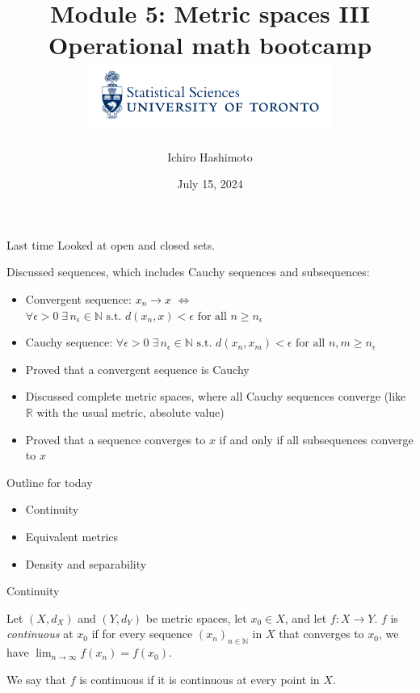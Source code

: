 \documentclass [aspectratio=169]{beamer}
\title[]{Module 5: Metric spaces III \\ {\large Operational math bootcamp}\\ \includegraphics[width=8cm]{dept_logo.png}\vspace{-1em}}
\author[]{Ichiro Hashimoto}
\institute[]{University of Toronto}
\date{July 15, 2024}
\newcommand{\R}{{\mathbb{R}}}
\newcommand{\N}{{\mathbb{N}}}
\begin{document}
{
\begin{frame}
    \titlepage
\end{frame}
}


\begin{frame}{Last time}
Looked at open and closed sets.

\vspace{0.5em}

Discussed sequences, which includes Cauchy sequences and subsequences:
\vspace{0.5em}
	\begin{itemize}
	   \setlength\itemsep{0.6em}
	\item Convergent sequence: $x_n \to x$ $\Leftrightarrow$ $\forall \epsilon > 0 \; \exists \, n_\epsilon \in \N \text{ s.t. } d(x_n,x) < \epsilon \text{ for all } n \geq n_\epsilon$
	\item Cauchy sequence:  $ \forall \epsilon>0 \; \exists \, n_\epsilon \in \N \text{ s.t. } d(x_n,x_m) < \epsilon \text{ for all } n,m \geq n_\epsilon$
	\item Proved that a convergent sequence is Cauchy
	\item Discussed complete metric spaces, where all Cauchy sequences converge (like $\R$ with the usual metric, absolute value)
	\item Proved that a sequence converges to $x$ if and only if all subsequences converge to $x$
    \end{itemize}
\end{frame}

\begin{frame}{Outline for today}
    \begin{itemize}
      \setlength\itemsep{1em}
    	\item Continuity
	\item Equivalent metrics
	\item Density and separability
    \end{itemize}
\end{frame}


\begin{frame}{Continuity}
\begin{definition}
Let $(X,d_X)$ and $(Y,d_Y)$ be metric spaces, let $x_0 \in X$, and let $f:X\to Y$. $f$ is \emph{continuous} at $x_0$ if for every sequence $(x_n)_{n\in\N}$ in $X$ that converges to $x_0$, we have $\lim_{n\to\infty}f(x_n)=f(x_0)$.

\vspace{1em}

We say that $f$ is continuous if it is continuous at every point in $X$.
\end{definition}
\end{frame}
\end{document}

